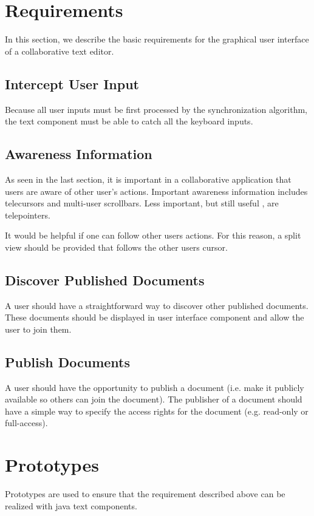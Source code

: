 \documentclass[11pt,a4paper]{article}
\begin{document}
\section{Requirements}
In this section, we describe the basic requirements for the graphical user interface of a collaborative text editor.

\subsection{Intercept User Input}
Because all user inputs must be first processed by the synchronization algorithm, the text component must be able to catch all the keyboard inputs.

\subsection{Awareness Information}
As seen in the last section, it is important in a collaborative application that users are aware of other user's actions. Important awareness information includes telecursors and multi-user scrollbars. Less important, but still useful , are telepointers.

It would be helpful if one can follow other users actions. For this reason, a split view should be provided that follows the other users cursor.

\subsection{Discover Published Documents}
A user should have a straightforward way to discover other published documents. These documents should be displayed in user interface component and allow the user to join them.

\subsection{Publish Documents}
A user should have the opportunity to publish a document (i.e. make it publicly available so others can join the document). The publisher of a document should have a simple way to specify the access rights for the document (e.g. read-only or full-access).


\section{Prototypes}
Prototypes are used to ensure that the requirement described above can be realized with java text components.
\end{document}
